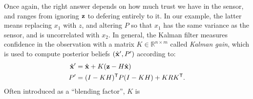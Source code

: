 \begin{subappendices}
\begin{example}
    Once again, the right answer depends on how much trust we have
    in the sensor, and ranges from ignoring $\mathbf z$ to defering entirely
    to it.
    In our example, the latter means replacing $x_1$ with $z$,
    and altering $P$ so that $x_1$ has the same variance as the sensor,
    and is uncorrelated with $x_2$.
    In general,
    the Kalman filter measures confidence in the observation
    with a matrix $K \in \mathbb R^{n \times m}$ called \emph{Kalman gain},
    which is used to compute posterior beliefs
    $(\hat{\mathbf x}', P')$
    according to:
    \begin{align*}
    \hat{\mathbf x}' &= \hat{\mathbf x} + K (\mathbf z - H \hat{\mathbf x}) \\
    P' &= (I - K H)^{\sf T} P (I - K H) + K R K^{\sf T} .
    \end{align*}
    Often introduced as a ``blending factor'', $K$ is

\end{example}
\end{subappendices}
